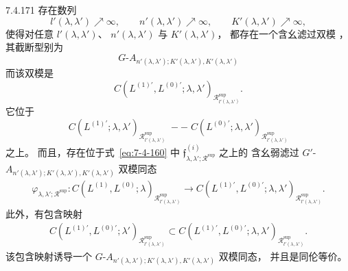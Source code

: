 \begin{proposition}{7.4.171}\label{prop:7-4-171}
存在数列
\[
l'(\lambda,\lambda')\nearrow\infty,
\qquad
n'(\lambda,\lambda')\nearrow\infty,
\qquad
K'(\lambda,\lambda')\nearrow\infty,
\]
使得对任意
$l'(\lambda,\lambda')$、
$n'(\lambda,\lambda')$ 与
$K'(\lambda,\lambda')$，
都存在一个含幺滤过双模
，
其截断型别为
\[
G\text{-}A_{n'(\lambda,\lambda');
K'(\lambda,\lambda'),K'(\lambda,\lambda')}
\]
而该双模是
\begin{equation}
C(L^{(1)\prime},L^{(0)\prime};\lambda,\lambda')_
{\mathcal R^{\mathrm{sup}}_{l'(\lambda,\lambda')}}.
\tag{7.4.172}\label{eq:7-4-172}
\end{equation}
它位于
\[
C(L^{(1)\prime};\lambda,\lambda')_
{\mathcal R^{\mathrm{sup}}_{l'(\lambda,\lambda')}}
\;--\;
C(L^{(0)\prime};\lambda,\lambda')_
{\mathcal R^{\mathrm{sup}}_{l'(\lambda,\lambda')}}
\]
之上。
而且，存在位于式~\eqref{eq:7-4-160} 中
$\mathfrak f^{(i)}_{\lambda,\lambda';
\mathcal R^{\mathrm{sup}}}$ 之上的
含幺弱滤过
$G'$-$A_{n'(\lambda,\lambda');
K'(\lambda,\lambda'),K'(\lambda,\lambda')}$ 双模同态
\begin{equation}
\begin{aligned}
\varphi_{\lambda,\lambda';\mathcal R^{\mathrm{sup}}}\colon
C(L^{(1)},L^{(0)};\lambda)_
{\mathcal R^{\mathrm{sup}}_{l'(\lambda,\lambda')}}
\longrightarrow
C(L^{(1)\prime},L^{(0)\prime};\lambda,\lambda')_
{\mathcal R^{\mathrm{sup}}_{l'(\lambda,\lambda')}}.
\end{aligned}
\tag{7.4.173}\label{eq:7-4-173}
\end{equation}
此外，有包含映射
\[
\begin{aligned}
C(L^{(1)\prime},L^{(0)\prime};\lambda')_
{\mathcal R^{\mathrm{sup}}_{l'(\lambda,\lambda')}}
\subset
C(L^{(1)\prime},L^{(0)\prime};\lambda,\lambda')_
{\mathcal R^{\mathrm{sup}}_{l'(\lambda,\lambda')}}.
\end{aligned}
\]
该包含映射诱导一个
$G$-$A_{n'(\lambda,\lambda');
K'(\lambda,\lambda'),K'(\lambda,\lambda')}$ 双模同态，
并且是同伦等价。
\end{proposition}

